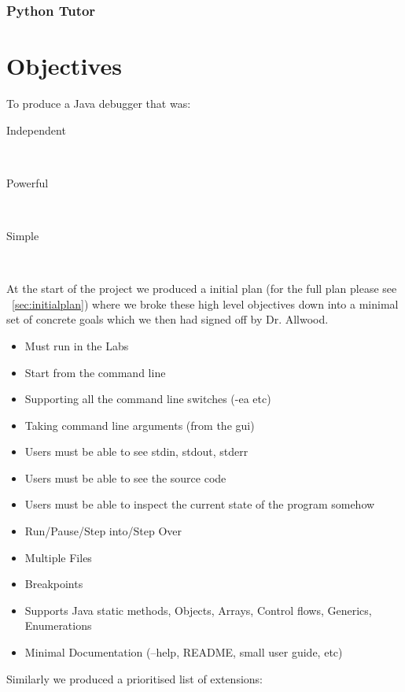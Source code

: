 \documentclass[11pt, a4paper]{article}
\begin{document}
\subsubsection{Python Tutor}


\section{Objectives} 

To produce a Java debugger that was:

\begin{description}
\item[Independent] \hfill \\
\item[Powerful] \hfill \\
\item[Simple] \hfill \\
\end{description}

At the start of the project we produced a initial plan (for the full plan please see ~\cref{sec:initialplan}) where we broke these high level objectives down into a minimal set of concrete goals which we then had signed off by Dr. Allwood.

\begin{itemize}
\item Must run in the Labs
\item Start from the command line
\item Supporting all the command line switches (-ea etc)
\item Taking command line arguments (from the gui)
\item Users must be able to see stdin, stdout, stderr
\item Users must be able to see the source code
\item Users must be able to inspect the current state of the program somehow
\item Run/Pause/Step into/Step Over
\item Multiple Files
\item Breakpoints
\item Supports Java static methods, Objects, Arrays, Control flows, Generics, Enumerations
\item Minimal Documentation (--help, README, small user guide, etc)
\end{itemize}

Similarly we produced a prioritised list of extensions:
\end{document}
